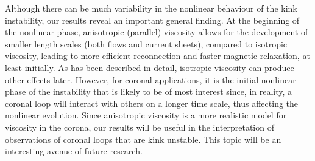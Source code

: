 Although there can be much variability in the nonlinear behaviour of the kink instability, our results reveal an important general finding. At the beginning of the nonlinear phase, anisotropic (parallel) viscosity allows for the development of smaller length scales (both flows and current sheets), compared to isotropic viscosity, leading to more efficient reconnection and faster magnetic relaxation, at least initially. As has been described in detail, isotropic viscosity can produce other effects later. However, for coronal applications, it is the initial nonlinear phase of the instability that is likely to be of most interest since, in reality, a coronal loop will interact with others on a longer time scale, thus affecting the nonlinear evolution. Since anisotropic viscosity is a more realistic model for viscosity in the corona, our results will be useful in the interpretation of observations of coronal loops that are kink unstable. This topic will be an interesting avenue of future research.
